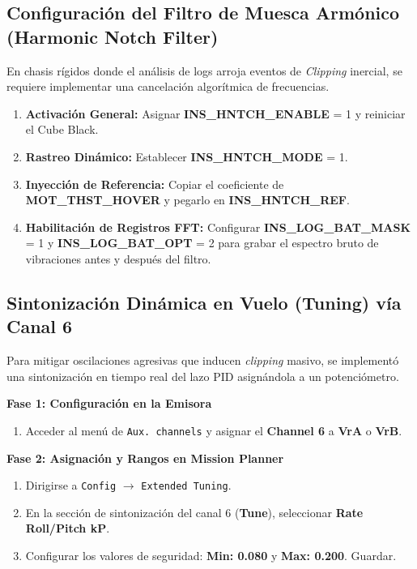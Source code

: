 \documentclass[12pt,a4paper]{article}
\begin{document}
\subsection{Configuración del Filtro de Muesca Armónico (Harmonic Notch Filter)}
En chasis rígidos donde el análisis de logs arroja eventos de \textit{Clipping} inercial, se requiere implementar una cancelación algorítmica de frecuencias.
\begin{enumerate}[leftmargin=*]
    \item \textbf{Activación General:} Asignar \textbf{INS\_HNTCH\_ENABLE} = 1 y reiniciar el Cube Black.
    \item \textbf{Rastreo Dinámico:} Establecer \textbf{INS\_HNTCH\_MODE} = 1.
    \item \textbf{Inyección de Referencia:} Copiar el coeficiente de \textbf{MOT\_THST\_HOVER} y pegarlo en \textbf{INS\_HNTCH\_REF}.
    \item \textbf{Habilitación de Registros FFT:} Configurar \textbf{INS\_LOG\_BAT\_MASK} = 1 y \textbf{INS\_LOG\_BAT\_OPT} = 2 para grabar el espectro bruto de vibraciones antes y después del filtro.
\end{enumerate}

\subsection{Sintonización Dinámica en Vuelo (Tuning) vía Canal 6}
Para mitigar oscilaciones agresivas que inducen \textit{clipping} masivo, se implementó una sintonización en tiempo real del lazo PID asignándola a un potenciómetro.

\textbf{Fase 1: Configuración en la Emisora}
\begin{enumerate}[leftmargin=*]
    \item Acceder al menú de \texttt{Aux. channels} y asignar el \textbf{Channel 6} a \textbf{VrA} o \textbf{VrB}.
\end{enumerate}

\textbf{Fase 2: Asignación y Rangos en Mission Planner}
\begin{enumerate}[leftmargin=*]
    \item Dirigirse a \texttt{Config} $\rightarrow$ \texttt{Extended Tuning}.
    \item En la sección de sintonización del canal 6 (\textbf{Tune}), seleccionar \textbf{Rate Roll/Pitch kP}.
    \item Configurar los valores de seguridad: \textbf{Min: 0.080} y \textbf{Max: 0.200}. Guardar.
\end{enumerate}
\end{document}
